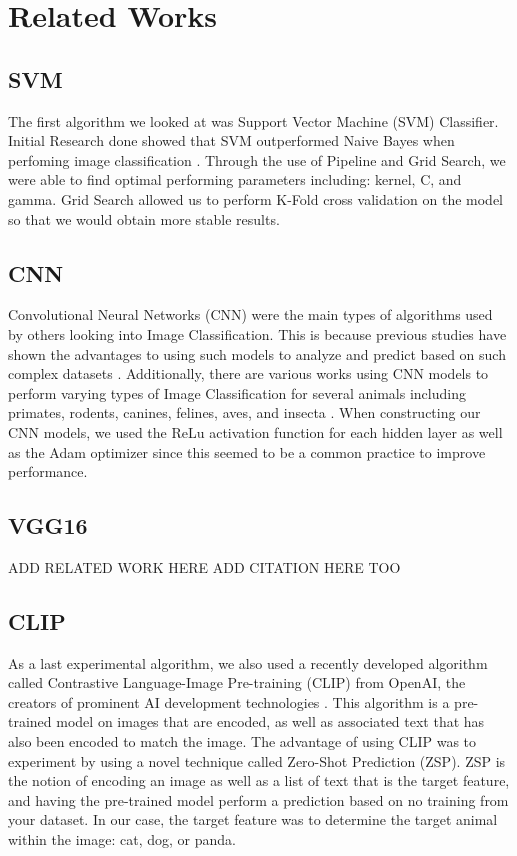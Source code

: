 \graphicspath{ {project_images/} }
\section{Related Works}

\subsection{SVM}
The first algorithm we looked at was Support Vector Machine (SVM) Classifier. 
Initial Research done showed that SVM outperformed Naive Bayes when perfoming image classification \cite{SVM}.
Through the use of Pipeline and Grid Search, we were able to find optimal performing parameters including: kernel, C, and gamma.
Grid Search allowed us to perform K-Fold cross validation on the model so that we would obtain more stable results.

\subsection{CNN}
Convolutional Neural Networks (CNN) were the main types of algorithms used by others looking into Image Classification.
This is because previous studies have shown the advantages to using such models to analyze and predict based on such complex datasets \cite{CNNPerformance}.
Additionally, there are various works using CNN models to perform varying types of Image Classification for several animals including primates, rodents, canines, felines, aves, and insecta \cite{AnimalSpecies1, AnimalSpecies2, AnimalBreed, Mosquito}.
When constructing our CNN models, we used the ReLu activation function for each hidden layer as well as the Adam optimizer since this seemed to be a common practice to improve performance.

\subsection{VGG16}
ADD RELATED WORK HERE
ADD CITATION HERE TOO

\subsection{CLIP}
As a last experimental algorithm, we also used a recently developed algorithm called Contrastive Language-Image Pre-training (CLIP) from OpenAI, the creators of prominent AI development technologies \cite{CLIP}.
This algorithm is a pre-trained model on images that are encoded, as well as associated text that has also been encoded to match the image.
The advantage of using CLIP was to experiment by using a novel technique called Zero-Shot Prediction (ZSP).
ZSP is the notion of encoding an image as well as a list of text that is the target feature, and having the pre-trained model perform a prediction based on no training from your dataset.
In our case, the target feature was to determine the target animal within the image: cat, dog, or panda.

